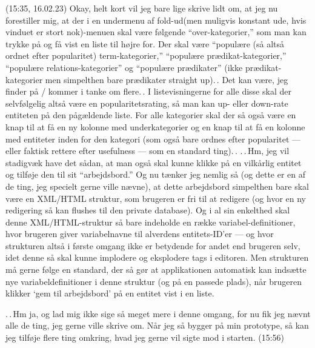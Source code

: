 \documentclass{report}
\begin{document}
(15:35, 16.02.23) Okay, helt kort vil jeg bare lige skrive lidt om, at jeg nu forestiller mig, at der i en undermenu af fold-ud(men muligvis konstant ude, hvis vinduet er stort nok)-menuen skal være følgende ``over-kategorier,'' som man kan trykke på og få vist en liste til højre for. Der skal være ``populære (så altså ordnet efter popularitet) term-kategorier,'' ``populære prædikat-kategorier,'' ``populære relations-kategorier'' og ``populære prædikater'' (ikke prædikat-kategorier men simpelthen bare prædikater straight up).\,. Det kan være, jeg finder på / kommer i tanke om flere.\,. I listevisningerne for alle disse skal der selvfølgelig altså være en popularitetsrating, så man kan up- eller down-rate entiteten på den pågældende liste. For alle kategorier skal der så også være en knap til at få en ny kolonne med underkategorier og en knap til at få en kolonne med entiteter inden for den kategori (som også bare ordnes efter popularitet --- eller faktisk rettere efter usefulness --- som en standard ting).\,. .\,.\,Hm, jeg vil stadigvæk have det sådan, at man også skal kunne klikke på en vilkårlig entitet og tilføje den til sit ``arbejdsbord.'' Og nu tænker jeg nemlig så (og dette er en af de ting, jeg specielt gerne ville nævne), at dette arbejdsbord simpelthen bare skal være en XML/HTML struktur, som brugeren er fri til at redigere (og hvor en ny redigering så kan flushes til den private database). Og i al sin enkelthed skal denne XML/HTML-struktur så bare indeholde en række variabel-definitioner, hvor brugeren giver variabelnavne til alverdens entitets-ID'er --- og hvor strukturen altså i første omgang ikke er betydende for andet end brugeren selv, idet denne så skal kunne implodere og eksplodere tags i editoren. Men strukturen må gerne følge en standard, der så gør at applikationen automatisk kan indsætte nye variabeldefinitioner i denne struktur (og på en passede plads), når brugeren klikker `gem til arbejdsbord' på en entitet vist i en liste. 

.\,.\,Hm ja, og lad mig ikke sige så meget mere i denne omgang, for nu fik jeg nævnt alle de ting, jeg gerne ville skrive om. Når jeg så bygger på min prototype, så kan jeg tilføje flere ting omkring, hvad jeg gerne vil sigte mod i starten. (15:56)
\end{document}
